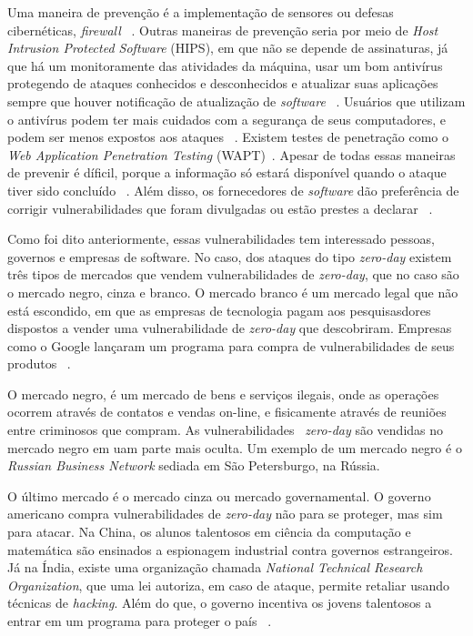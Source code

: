 \documentclass[brazil, utf8]{article}
\begin{document}
Uma maneira de prevenção é a implementação de sensores ou defesas cibernéticas, \textit{firewall} ~\cite{Last:2016}. Outras maneiras de 
prevenção seria por meio de \textit{Host Intrusion Protected Software} (HIPS), em que não se depende de assinaturas, já que há um 
monitoramente das atividades da máquina, usar um bom antivírus  protegendo de ataques conhecidos e desconhecidos e atualizar suas 
aplicações sempre que houver notificação de atualização de \textit{software} ~\cite{Kumar:2016}. Usuários que utilizam o antivírus podem 
ter mais cuidados com a segurança de seus computadores, e podem ser menos expostos aos ataques ~\cite{Bilge:2012}. Existem testes de 
penetração como o \textit{Web Application Penetration Testing} (WAPT)~\cite{Kumar:2016}. Apesar de todas essas maneiras de prevenir é 
díficil, porque a informação só estará disponível quando o ataque tiver sido concluído ~\cite{Kumar:2016}. Além disso, os fornecedores 
de \textit{software} dão preferência de corrigir vulnerabilidades que foram divulgadas ou estão prestes a declarar ~\cite{Bilge:2012}.

Como foi dito anteriormente, essas vulnerabilidades tem interessado pessoas, governos e empresas de software. No caso, dos ataques do 
tipo \textit{zero-day} existem três tipos de mercados que vendem vulnerabilidades de \textit{zero-day}, que no caso são o mercado negro, 
cinza e branco. O mercado branco é um mercado legal que não está escondido, em que as empresas de tecnologia pagam aos pesquisasdores 
dispostos a vender uma vulnerabilidade de \textit{zero-day} que descobriram. Empresas como o Google lançaram um programa para compra de 
vulnerabilidades de seus produtos ~\cite{Fotiet:2015}. 

O mercado negro, é um mercado de bens e serviços ilegais, onde as operações ocorrem através de contatos e vendas on-line, e fisicamente 
através de reuniões entre criminosos que compram. As vulnerabilidades ~\textit{zero-day} são vendidas no mercado negro em uam parte mais 
oculta. Um exemplo de um mercado negro é o \textit{Russian Business Network} sediada em São Petersburgo, na Rússia. 

O último mercado é o mercado cinza ou mercado governamental. O governo americano compra vulnerabilidades de \textit{zero-day} não para se 
proteger, mas sim para atacar. Na China, os alunos talentosos em ciência da computação e matemática são ensinados a espionagem industrial 
contra governos estrangeiros. Já na Índia, existe uma organização chamada \textit{National Technical Research Organization}, que uma lei 
autoriza, em caso de ataque, permite retaliar usando técnicas de \textit{hacking}. Além do que, o governo incentiva os jovens talentosos 
a entrar em um programa para proteger o país ~\cite{Fotiet:2015}.




\end{document}
